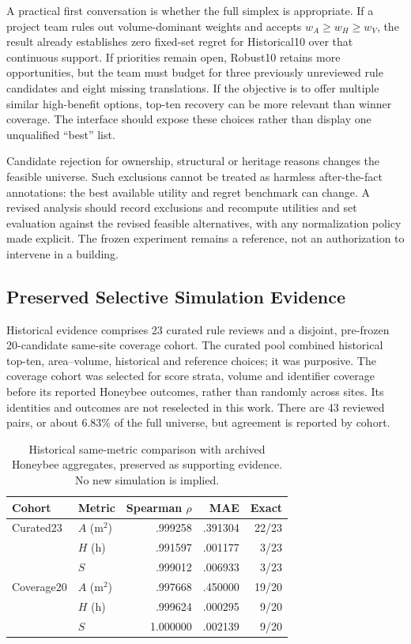 \documentclass{llncs}
\begin{document}
A practical first conversation is whether the full simplex is appropriate. If a project team rules out volume-dominant weights and accepts $w_A\geq w_H\geq w_V$, the result already establishes zero fixed-set regret for Historical10 over that continuous support. If priorities remain open, Robust10 retains more opportunities, but the team must budget for three previously unreviewed rule candidates and eight missing translations. If the objective is to offer multiple similar high-benefit options, top-ten recovery can be more relevant than winner coverage. The interface should expose these choices rather than display one unqualified ``best'' list.

Candidate rejection for ownership, structural or heritage reasons changes the feasible universe. Such exclusions cannot be treated as harmless after-the-fact annotations: the best available utility and regret benchmark can change. A revised analysis should record exclusions and recompute utilities and set evaluation against the revised feasible alternatives, with any normalization policy made explicit. The frozen experiment remains a reference, not an authorization to intervene in a building.

\subsection{Preserved Selective Simulation Evidence}
Historical evidence comprises 23 curated rule reviews and a disjoint, pre-frozen 20-candidate same-site coverage cohort. The curated pool combined historical top-ten, area--volume, historical and reference choices; it was purposive. The coverage cohort was selected for score strata, volume and identifier coverage before its reported Honeybee outcomes, rather than randomly across sites. Its identities and outcomes are not reselected in this work. There are 43 reviewed pairs, or about 6.83\% of the full universe, but agreement is reported by cohort.

\begin{table}[tbp]\caption{Historical same-metric comparison with archived Honeybee aggregates, preserved as supporting evidence. No new simulation is implied.}\label{tab:agreement}\centering
\begin{tabular}{llrrr}\toprule Cohort & Metric & Spearman $\rho$ & MAE & Exact\\\midrule
Curated23 & $A$ (m$^2$) & .999258 & .391304 & 22/23\\ & $H$ (h) & .991597 & .001177 & 3/23\\ & $S$ & .999012 & .006933 & 3/23\\
Coverage20 & $A$ (m$^2$) & .997668 & .450000 & 19/20\\ & $H$ (h) & .999624 & .000295 & 9/20\\ & $S$ & 1.000000 & .002139 & 9/20\\\bottomrule\end{tabular}\end{table}
\end{document}
